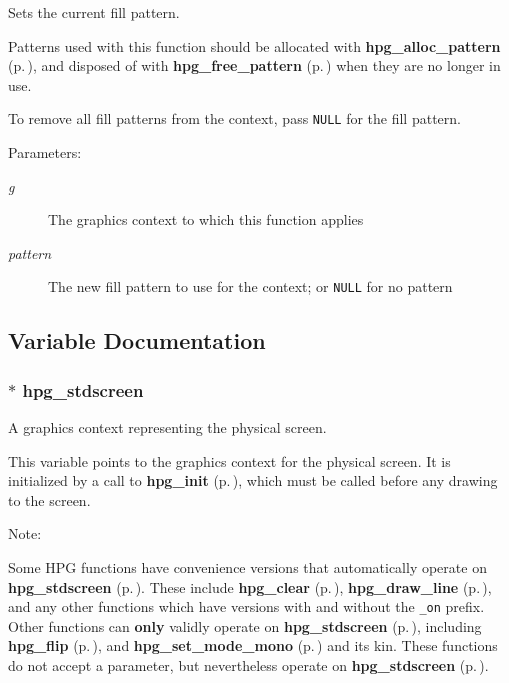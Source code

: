 Sets the current fill pattern.

Patterns used with this function should be allocated with {\bf hpg\_\-alloc\_\-pattern} {\rm (p.\,\pageref{hpgraphics_8h_a70})}, and disposed of with {\bf hpg\_\-free\_\-pattern} {\rm (p.\,\pageref{hpgraphics_8h_a71})} when they are no longer in use.

To remove all fill patterns from the context, pass {\tt NULL} for the fill pattern.\begin{Desc}
\item[Parameters: ]\par
\begin{description}
\item[{\em 
g}]The graphics context to which this function applies \item[{\em 
pattern}]The new fill pattern to use for the context; or {\tt NULL} for no pattern \end{description}
\end{Desc}


\subsection{Variable Documentation}
\subsubsection{$\ast$ hpg\_\-stdscreen}\label{hpgraphics_8h_a27}


A graphics context representing the physical screen.

This variable points to the graphics context for the physical screen. It is initialized by a call to {\bf hpg\_\-init} {\rm (p.\,\pageref{hpgraphics_8h_a28})}, which must be called before any drawing to the screen.

\begin{Desc}
\item[Note: ]\par
Some HPG functions have convenience versions that automatically operate on {\bf hpg\_\-stdscreen} {\rm (p.\,\pageref{hpgraphics_8h_a27})}. These include {\bf hpg\_\-clear} {\rm (p.\,\pageref{hpgraphics_8h_a39})}, {\bf hpg\_\-draw\_\-line} {\rm (p.\,\pageref{hpgraphics_8h_a43})}, and any other functions which have versions with and without the {\tt \_\-on} prefix. Other functions can {\bf only} validly operate on {\bf hpg\_\-stdscreen} {\rm (p.\,\pageref{hpgraphics_8h_a27})}, including {\bf hpg\_\-flip} {\rm (p.\,\pageref{hpgraphics_8h_a34})}, and {\bf hpg\_\-set\_\-mode\_\-mono} {\rm (p.\,\pageref{hpgraphics_8h_a30})} and its kin. These functions do not accept a parameter, but nevertheless operate on {\bf hpg\_\-stdscreen} {\rm (p.\,\pageref{hpgraphics_8h_a27})}. \end{Desc}
